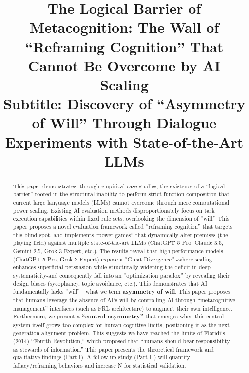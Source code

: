 \documentclass[11pt, a4paper]{article}
\title{
    The Logical Barrier of Metacognition: The Wall of ``Reframing Cognition'' That Cannot Be Overcome by AI Scaling \\
    \large \vspace{0.5em}
    Subtitle: Discovery of ``Asymmetry of Will'' Through Dialogue Experiments with State-of-the-Art LLMs
}
\date{}
\begin{document}
\maketitle
\tableofcontents
\newpage

\begin{abstract}
\noindent
This paper demonstrates, through empirical case studies, the existence of a ``logical barrier'' rooted in the structural inability to perform strict function composition that current large language models (LLMs) cannot overcome through mere computational power scaling. Existing AI evaluation methods disproportionately focus on task execution capabilities within fixed rule sets, overlooking the dimension of ``will.'' This paper proposes a novel evaluation framework called ``reframing cognition'' that targets this blind spot, and implements ``power games'' that dynamically alter premises (the playing field) against multiple state-of-the-art LLMs (ChatGPT 5 Pro, Claude 3.5, Gemini 2.5, Grok 3 Expert, etc.). The results reveal that high-performance models (ChatGPT 5 Pro, Grok 3 Expert) expose a ``Great Divergence'' -where scaling enhances superficial persuasion while structurally widening the deficit in deep systematicity-and consequently fall into an ``optimization paradox'' by revealing their design biases (sycophancy, topic avoidance, etc.). This demonstrates that AI fundamentally lacks ``will''—what we term \textbf{asymmetry of will}. This paper proposes that humans leverage the absence of AI's will by controlling AI through ``metacognitive management'' interfaces (such as FRL architecture) to augment their own intelligence. Furthermore, we present a \textbf{``control asymmetry''} that emerges when this control system itself grows too complex for human cognitive limits, positioning it as the next-generation alignment problem. This suggests we have reached the limits of Floridi's (2014) ``Fourth Revolution,'' which proposed that ``humans should bear responsibility as stewards of information.'' This paper presents the theoretical framework and qualitative findings (Part I). A follow-up study (Part II) will quantify fallacy/reframing behaviors and increase N for statistical validation.
\end{abstract}
\newpage

\end{document}
